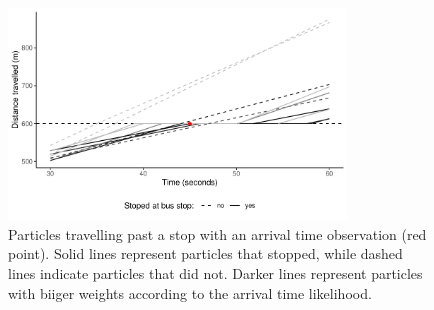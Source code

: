 \begin{knitrout}\small
{}\color{fgcolor}\begin{figure}

{\centering \includegraphics[width=0.8\textwidth]{figure/tu_update-1} 

}

\caption[Particles are weighted by their arrival time at a stop]{Particles travelling past a stop with an arrival time observation (red point). Solid lines represent particles that stopped, while dashed lines indicate particles that did not. Darker lines represent particles with biiger weights according to the arrival time likelihood.}\label{fig:tu_update}
\end{figure}


\end{knitrout}
